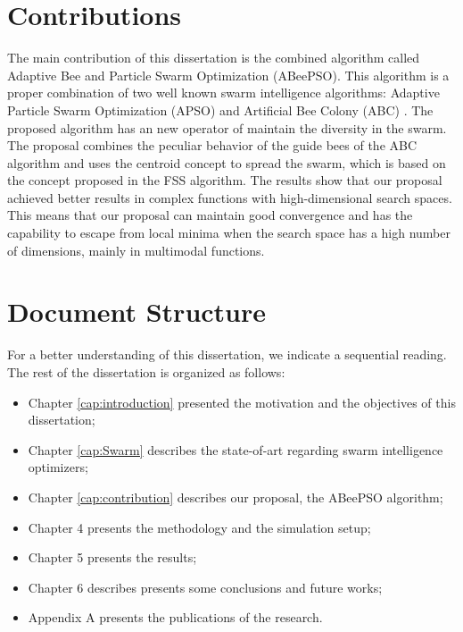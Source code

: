 \section{Contributions}
The main contribution of this dissertation is the combined algorithm called Adaptive Bee and Particle Swarm Optimization (ABeePSO). This algorithm is a proper combination of two well known swarm intelligence algorithms: Adaptive Particle Swarm Optimization (APSO) \cite{APSO:Zhan2009} and Artificial Bee Colony (ABC) \cite{ABC:Karaboga2005}. The proposed algorithm has an new operator of maintain the diversity in the swarm. The proposal combines the peculiar behavior of the guide bees of the ABC algorithm and uses the centroid concept to spread the swarm, which is based on the concept proposed in the FSS algorithm. The results show that our proposal achieved better results in complex functions with high-dimensional search spaces. This means that our proposal can maintain good convergence and has the capability to escape from local minima when the search space has a high number of dimensions, mainly in multimodal functions.


\section{Document Structure}
For a better understanding of this dissertation, we indicate a sequential reading. The rest of the dissertation is organized as follows:
\begin{itemize}
  \item Chapter \ref{cap:introduction} presented the motivation and the objectives of this dissertation;
  \item Chapter \ref{cap:Swarm} describes the state-of-art regarding swarm intelligence optimizers;
  \item Chapter \ref{cap:contribution} describes our proposal, the ABeePSO algorithm;
  \item Chapter 4 presents the methodology and the simulation setup;
  \item Chapter 5 presents the results;
  \item Chapter 6 describes presents some conclusions and future works;
  \item Appendix A presents the publications of the research.
\end{itemize}


